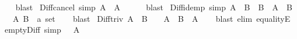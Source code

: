 \begin{isabellebody}
%
\isadelimproof
\ \ %
\endisadelimproof
%
\isatagproof
{}\isamarkupfalse%
\ blast%
\endisatagproof
{\isafoldproof}%
%
\isadelimproof
\isanewline
%
\endisadelimproof
\isanewline
{}\isamarkupfalse%
\ Diff{\isacharunderscore}{\kern0pt}cancel\ {\isacharbrackleft}{\kern0pt}simp{\isacharbrackright}{\kern0pt}{\isacharcolon}{\kern0pt}\ {\isachardoublequoteopen}A\ {\isacharminus}{\kern0pt}\ A\ {\isacharequal}{\kern0pt}\ {\isacharbraceleft}{\kern0pt}{\isacharbraceright}{\kern0pt}{\isachardoublequoteclose}\isanewline
%
\isadelimproof
\ \ %
\endisadelimproof
%
\isatagproof
{}\isamarkupfalse%
\ blast%
\endisatagproof
{\isafoldproof}%
%
\isadelimproof
\isanewline
%
\endisadelimproof
\isanewline
{}\isamarkupfalse%
\ Diff{\isacharunderscore}{\kern0pt}idemp\ {\isacharbrackleft}{\kern0pt}simp{\isacharbrackright}{\kern0pt}{\isacharcolon}{\kern0pt}\ {\isachardoublequoteopen}{\isacharparenleft}{\kern0pt}A\ {\isacharminus}{\kern0pt}\ B{\isacharparenright}{\kern0pt}\ {\isacharminus}{\kern0pt}\ B\ {\isacharequal}{\kern0pt}\ A\ {\isacharminus}{\kern0pt}\ B{\isachardoublequoteclose}\isanewline
\ \ \ A\ B\ {\isacharcolon}{\kern0pt}{\isacharcolon}{\kern0pt}\ {\isachardoublequoteopen}{\isacharprime}{\kern0pt}a\ set{\isachardoublequoteclose}\isanewline
%
\isadelimproof
\ \ %
\endisadelimproof
%
\isatagproof
{}\isamarkupfalse%
\ blast%
\endisatagproof
{\isafoldproof}%
%
\isadelimproof
\isanewline
%
\endisadelimproof
\isanewline
{}\isamarkupfalse%
\ Diff{\isacharunderscore}{\kern0pt}triv{\isacharcolon}{\kern0pt}\ {\isachardoublequoteopen}A\ {\isasyminter}\ B\ {\isacharequal}{\kern0pt}\ {\isacharbraceleft}{\kern0pt}{\isacharbraceright}{\kern0pt}\ {\isasymLongrightarrow}\ A\ {\isacharminus}{\kern0pt}\ B\ {\isacharequal}{\kern0pt}\ A{\isachardoublequoteclose}\isanewline
%
\isadelimproof
\ \ %
\endisadelimproof
%
\isatagproof
{}\isamarkupfalse%
\ {\isacharparenleft}{\kern0pt}blast\ elim{\isacharcolon}{\kern0pt}\ equalityE{\isacharparenright}{\kern0pt}%
\endisatagproof
{\isafoldproof}%
%
\isadelimproof
\isanewline
%
\endisadelimproof
\isanewline
{}\isamarkupfalse%
\ empty{\isacharunderscore}{\kern0pt}Diff\ {\isacharbrackleft}{\kern0pt}simp{\isacharbrackright}{\kern0pt}{\isacharcolon}{\kern0pt}\ {\isachardoublequoteopen}{\isacharbraceleft}{\kern0pt}{\isacharbraceright}{\kern0pt}\ {\isacharminus}{\kern0pt}\ A\ {\isacharequal}{\kern0pt}\ {\isacharbraceleft}{\kern0pt}{\isacharbraceright}{\kern0pt}{\isachardoublequoteclose}\isanewline
%
\isadelimproof
\ \ %
\endisadelimproof

\end{isabellebody}
